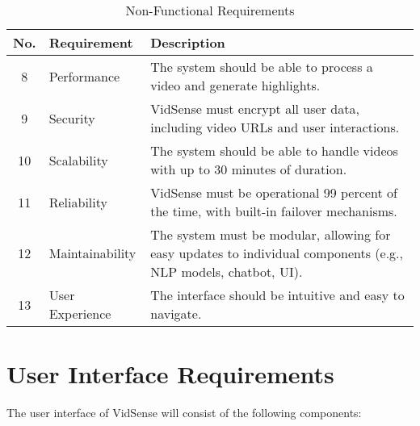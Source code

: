 \documentclass{bscs}
\begin{document}
\begin{table}[h]
    \centering
    \begin{tabular}{|c|p{5cm}|p{9cm}|}
        \hline
        \textbf{No.} & \textbf{Requirement} & \textbf{Description} \\
        \hline
        8 & Performance & The system should be able to process a video and generate highlights. \\
        \hline
        9 & Security & VidSense must encrypt all user data, including video URLs and user interactions. \\
        \hline
        10 & Scalability & The system should be able to handle videos with up to 30 minutes of duration. \\
        \hline
        11 & Reliability & VidSense must be operational 99 percent of the time, with built-in failover mechanisms. \\
        \hline
        12 & Maintainability & The system must be modular, allowing for easy updates to individual components (e.g., NLP models, chatbot, UI). \\
        \hline
        13 & User Experience & The interface should be intuitive and easy to navigate. \\
        \hline
    \end{tabular}
    \caption{Non-Functional Requirements}
\end{table}

\section{User Interface Requirements}

The user interface of VidSense will consist of the following components:
\end{document}
